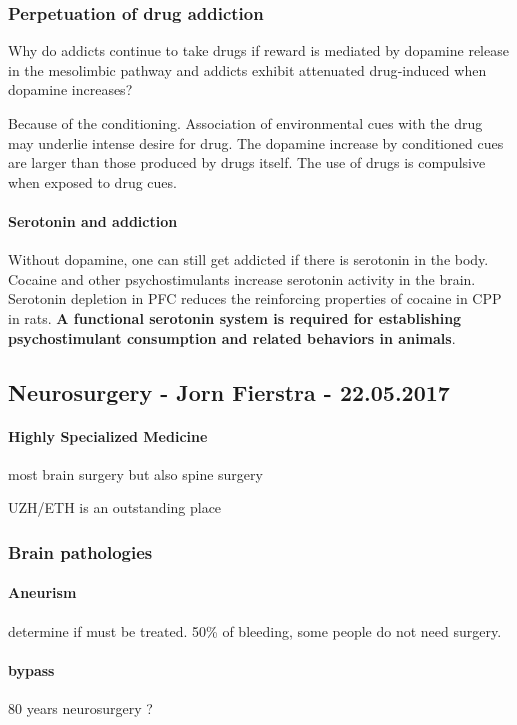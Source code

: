 \documentclass[12pt,article,oneside,a4paper]{memoir}
\begin{document}
\subsubsection{Perpetuation of drug addiction}
Why do addicts continue to take drugs if reward is mediated by dopamine release in the mesolimbic pathway and addicts exhibit attenuated drug‐induced when dopamine increases?

Because of the conditioning. Association of environmental cues with the drug may underlie intense desire for drug. The dopamine increase by conditioned cues are larger than those produced by drugs itself. The use of drugs is compulsive when exposed to drug cues.

\paragraph{Serotonin and addiction}
Without dopamine, one can still get addicted if there is serotonin in the body. Cocaine and other psychostimulants increase serotonin activity in the brain. Serotonin depletion in PFC reduces the reinforcing properties of cocaine in CPP in rats. \textbf{A functional serotonin system is required for establishing psychostimulant consumption and related behaviors in animals}.


\newpage
\subsection{Neurosurgery - Jorn Fierstra - 22.05.2017}
\paragraph{Highly Specialized Medicine} most brain surgery but also spine surgery

UZH/ETH is an outstanding place

\subsubsection{Brain pathologies}
\paragraph{Aneurism} determine if must be treated. 50\% of bleeding, some people do not need surgery.
\paragraph{bypass} 80 years neurosurgery ?
\end{document}
